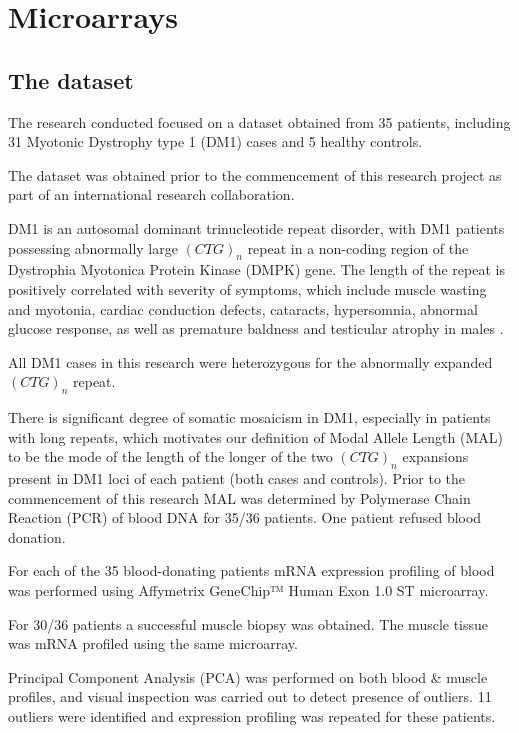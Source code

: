 \chapter{Microarrays}
\label{c:microarrays}

\section{The dataset} \label{chapter_dataset}

The research conducted focused on a dataset obtained from 35 patients, including 31 Myotonic Dystrophy type 1 (DM1) cases and 5 healthy controls.

The dataset was obtained prior to the commencement of this research project as part of an international research collaboration.

DM1 is an autosomal dominant trinucleotide repeat disorder, with DM1 patients possessing abnormally large $(CTG)_n$ repeat in a non-coding region of the Dystrophia Myotonica Protein Kinase (DMPK) gene. The length of the repeat is positively correlated with severity of symptoms, which include muscle wasting and myotonia, cardiac conduction defects, cataracts, hypersomnia, abnormal glucose response, as well as premature baldness and testicular atrophy in males \parencite{Brook1992}.

All DM1 cases in this research were heterozygous for the abnormally expanded $(CTG)_n$ repeat.

There is significant degree of somatic mosaicism in DM1, especially in patients with long repeats, which motivates our definition of Modal Allele Length (MAL) to be the mode of the length of the longer of the two $(CTG)_n$ expansions present in DM1 loci of each patient (both cases and controls). Prior to the commencement of this research MAL was determined by Polymerase Chain Reaction (PCR) of blood DNA for 35/36 patients. One patient refused blood donation.

For each of the 35 blood-donating patients mRNA expression profiling of blood was performed using Affymetrix GeneChip™ Human Exon 1.0 ST microarray.

For 30/36 patients a successful muscle biopsy was obtained. The muscle tissue was mRNA profiled using the same microarray.

Principal Component Analysis (PCA) was performed on both blood \& muscle profiles, and visual inspection was carried out to detect presence of outliers. 11 outliers were identified and expression profiling was repeated for these patients.

